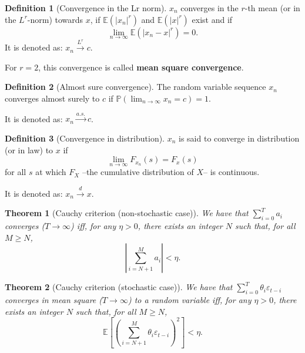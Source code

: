 \documentclass[
  11pt,
]{book}
\newtheorem{theorem}{Theorem}[chapter]
\theoremstyle{definition}
\newtheorem{definition}{Definition}[chapter]
\theoremstyle{definition}
\theoremstyle{definition}
\theoremstyle{definition}
\theoremstyle{remark}
\begin{document}
\begin{definition}[Convergence in the Lr norm]
\protect\hypertarget{def:convergenceLr}{}\label{def:convergenceLr}\(x_n\) converges in the \(r\)-th mean (or in the \(L^r\)-norm) towards \(x\), if \(\mathbb{E}(|x_n|^r)\) and \(\mathbb{E}(|x|^r)\) exist and if
\[
\lim_{n \rightarrow \infty} \mathbb{E}(|x_n - x|^r) = 0.
\]
It is denoted as: \(x_n \overset{L^r}{\rightarrow} c\).

For \(r=2\), this convergence is called \textbf{mean square convergence}.
\end{definition}

\begin{definition}[Almost sure convergence]
\protect\hypertarget{def:convergenceAlmost}{}\label{def:convergenceAlmost}The random variable sequence \(x_n\) converges almost surely to \(c\) if \(\mathbb{P}(\lim_{n \rightarrow \infty} x_n = c) = 1\).

It is denoted as: \(x_n \overset{a.s.}{\rightarrow} c\).
\end{definition}

\begin{definition}[Convergence in distribution]
\protect\hypertarget{def:cvgceDistri}{}\label{def:cvgceDistri}\(x_n\) is said to converge in distribution (or in law) to \(x\) if
\[
\lim_{n \rightarrow \infty} F_{x_n}(s) = F_{x}(s)
\]
for all \(s\) at which \(F_X\) --the cumulative distribution of \(X\)-- is continuous.

It is denoted as: \(x_n \overset{d}{\rightarrow} x\).
\end{definition}

\begin{theorem}[Cauchy criterion (non-stochastic case)]
\protect\hypertarget{thm:cauchycritstatic}{}\label{thm:cauchycritstatic}We have that \(\sum_{i=0}^{T} a_i\) converges (\(T \rightarrow \infty\)) iff, for any \(\eta > 0\), there exists an integer \(N\) such that, for all \(M\ge N\),
\[
\left|\sum_{i=N+1}^{M} a_i\right| < \eta.
\]
\end{theorem}

\begin{theorem}[Cauchy criterion (stochastic case)]
\protect\hypertarget{thm:cauchycritstochastic}{}\label{thm:cauchycritstochastic}We have that \(\sum_{i=0}^{T} \theta_i \varepsilon_{t-i}\) converges in mean square (\(T \rightarrow \infty\)) to a random variable iff, for any \(\eta > 0\), there exists an integer \(N\) such that, for all \(M\ge N\),
\[
\mathbb{E}\left[\left(\sum_{i=N+1}^{M} \theta_i \varepsilon_{t-i}\right)^2\right] < \eta.
\]
\end{theorem}
\end{document}
